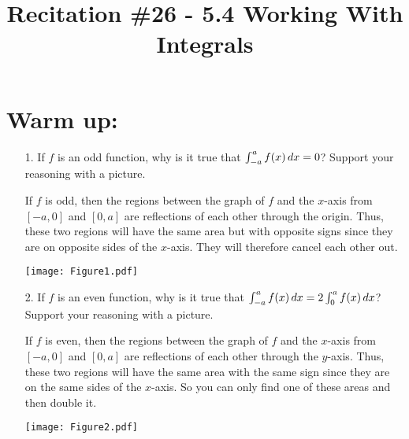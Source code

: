 \documentclass[handout,nooutcomes]{ximera}
\title{Recitation \#26 - 5.4 Working With Integrals}
\begin{document}
\begin{abstract}		\end{abstract}
\maketitle

\section*{Warm up:} 
	\begin{enumerate}
		
	\item[1.]  If $f$ is an odd function, why is it true that $\int_{-a}^a f(x) \,d x = 0$?  
	Support your reasoning with a picture.
		\begin{freeResponse}
		If $f$ is odd, then the regions between the graph of $f$ and the $x$-axis from $[-a,0]$ and $[0,a]$ are reflections of each other through the origin.  Thus, these two regions will have the same area but with opposite signs since they are on opposite sides of the $x$-axis.  They will therefore cancel each other out.
		
			\begin{image}
			\texttt{[image: Figure1.pdf]}
			\end{image}

		\end{freeResponse}	
		
		
		
	\item[2.]  If $f$ is an even function, why is it true that $\int_{-a}^a f(x) \,d x = 2 \int_0^a f(x) \,d x$?  
	Support your reasoning with a picture.
		\begin{freeResponse}
		If $f$ is even, then the regions between the graph of $f$ and the $x$-axis from $[-a,0]$ and $[0,a]$ are reflections of each other through the $y$-axis.  
		Thus, these two regions will have the same area with the same sign since they are on the same sides of the $x$-axis.
		So you can only find one of these areas and then double it.
		
			\begin{image}
			\texttt{[image: Figure2.pdf]}
			\end{image}
			
		\end{freeResponse}	
		
		
		
	\end{enumerate}
		
\end{document}
